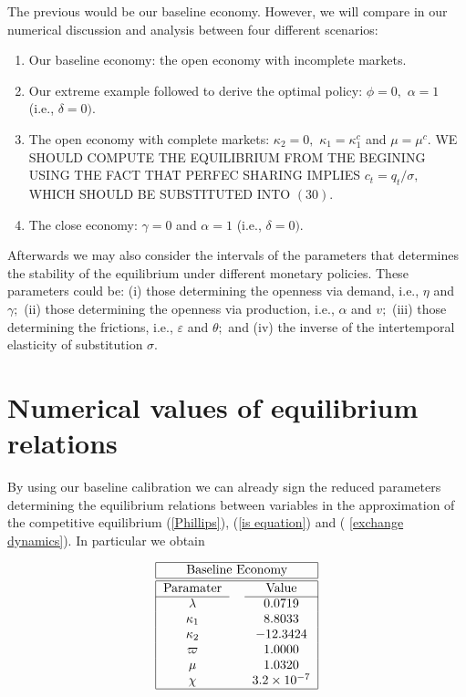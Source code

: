 \documentclass{article}
\begin{document}
The previous would be our baseline economy. However, we will compare in our
numerical discussion and analysis between four different scenarios:

\begin{enumerate}
\item Our baseline economy: the open economy with incomplete markets.

\item Our extreme example followed to derive the optimal policy: $\phi =0,$ $%
\alpha =1$ (i.e., $\delta =0)$.

\item The open economy with complete markets: $\kappa _{2}=0,$ $\kappa
_{1}=\kappa _{1}^{c}$ and $\mu =\mu ^{c}.$ WE SHOULD COMPUTE THE EQUILIBRIUM
FROM THE BEGINING USING THE FACT THAT PERFEC SHARING IMPLIES $%
c_{t}=q_{t}/\sigma ,$ WHICH SHOULD BE SUBSTITUTED INTO $(30).$

\item The close economy: $\gamma =0$ and $\alpha =1$ (i.e., $\delta =0).$
\end{enumerate}

Afterwards we may also consider the intervals of the parameters that
determines the stability of the equilibrium under different monetary
policies. These parameters could be: (i) those determining the openness via
demand, i.e., $\eta $ and $\gamma ;$ (ii) those determining the openness via
production, i.e., $\alpha $ and $v;$ (iii) those determining the frictions,
i.e., $\varepsilon $ and $\theta ;$ and (iv) the inverse of the
intertemporal elasticity of substitution $\sigma .$

\section{Numerical values of equilibrium relations}

By using our baseline calibration we can already sign the reduced parameters
determining the equilibrium relations between variables in the approximation
of the competitive equilibrium (\ref{Phillips}), (\ref{is equation}) and (%
\ref{exchange dynamics}). In particular we obtain

\begin{center}
\begin{equation*}
\begin{tabular}{|ccc|}
\hline
\multicolumn{3}{|c|}{Baseline Economy} \\ \hline\hline
Paramater &  & Value \\ \cline{1-1}\cline{3-3}
$\lambda $ &  & $0.0719$ \\ 
$\kappa _{1}$ &  & $8.8033$ \\ 
$\kappa _{2}$ &  & $-12.3424$ \\ 
$\varpi $ &  & $1.0000$ \\ 
$\mu $ &  & $1.0320$ \\ 
$\chi $ &  & $3.2\times 10^{-7}$ \\ \hline
\end{tabular}%
\end{equation*}
\end{center}
\end{document}
